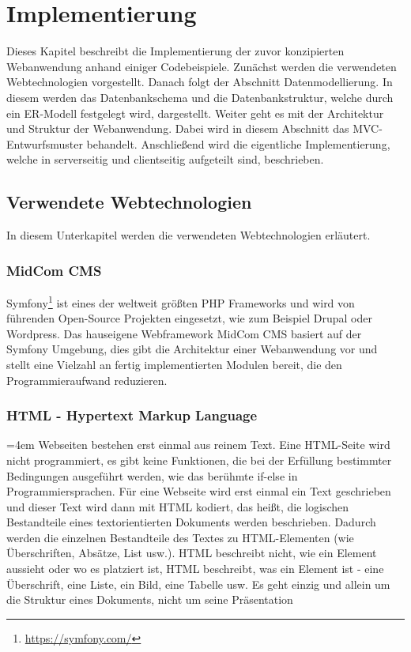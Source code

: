 \chapter{Implementierung}
\label{sec:implementierung}
Dieses Kapitel beschreibt die Implementierung der zuvor konzipierten Webanwendung anhand einiger Codebeispiele. Zunächst werden die verwendeten Webtechnologien vorgestellt. Danach folgt der Abschnitt Datenmodellierung. In diesem werden das Datenbankschema und die Datenbankstruktur, welche durch ein ER-Modell festgelegt wird, dargestellt. Weiter geht es mit der Architektur und Struktur der Webanwendung. Dabei wird in diesem Abschnitt das MVC-Entwurfsmuster behandelt. Anschließend wird die eigentliche Implementierung, welche in serverseitig und clientseitig aufgeteilt sind, beschrieben.

\section{Verwendete Webtechnologien}
\label{sec:verwendete webtechnologien}
In diesem Unterkapitel werden die verwendeten Webtechnologien erläutert. 

\subsection{MidCom CMS}
\label{subsec:midcom cms}
Symfony\footnote{\url{https://symfony.com/}} ist eines der weltweit größten PHP Frameworks und wird von führenden Open-Source Projekten eingesetzt, wie zum Beispiel Drupal oder Wordpress. Das hauseigene Webframework MidCom CMS basiert auf der Symfony Umgebung, dies gibt die Architektur einer Webanwendung vor und stellt eine Vielzahl an fertig implementierten Modulen bereit, die den Programmieraufwand reduzieren.

\subsection{HTML - Hypertext Markup Language}
\label{subsec:html}
\par
\begingroup
\leftskip=4em %
\rightskip\leftskip
\noindent \glqq Webseiten bestehen erst einmal aus reinem Text. Eine HTML-Seite wird nicht programmiert, es gibt keine Funktionen, die bei der Erfüllung bestimmter Bedingungen ausgeführt werden, wie das berühmte if-else in Programmiersprachen. Für eine Webseite wird erst einmal ein Text geschrieben und dieser Text wird dann mit HTML kodiert, das heißt, die logischen Bestandteile eines textorientierten Dokuments werden beschrieben. Dadurch werden die einzelnen Bestandteile des Textes zu HTML-Elementen (wie Überschriften, Absätze, List usw.). HTML beschreibt nicht, wie ein Element aussieht oder wo es platziert ist, HTML beschreibt, was ein Element ist - eine Überschrift, eine Liste, ein Bild, eine Tabelle usw. Es geht einzig und allein um die Struktur eines Dokuments, nicht um seine Präsentation\grqq{} \cite{Schu2008}
\par
\endgroup
\bigskip

